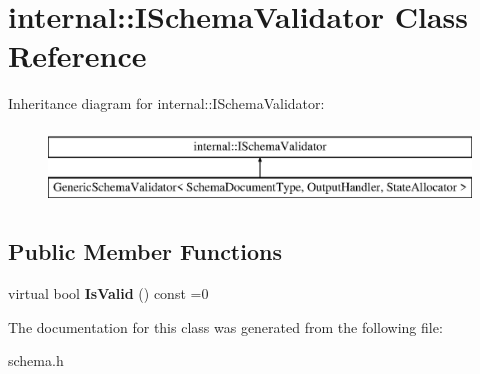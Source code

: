 \hypertarget{a00183}{}\section{internal\+:\+:I\+Schema\+Validator Class Reference}
\label{a00183}
Inheritance diagram for internal\+:\+:I\+Schema\+Validator\+:\begin{figure}[H]
\begin{center}
\leavevmode
\includegraphics[height=2.000000cm]{a00183}
\end{center}
\end{figure}
\subsection*{Public Member Functions}
\begin{DoxyCompactItemize}
\item 
virtual bool {\bfseries Is\+Valid} () const  =0\hypertarget{a00183_ad9c95f664966bec385dbe85f33a6ba3d}{}\label{a00183_ad9c95f664966bec385dbe85f33a6ba3d}

\end{DoxyCompactItemize}


The documentation for this class was generated from the following file\+:\begin{DoxyCompactItemize}
\item 
schema.\+h\end{DoxyCompactItemize}
